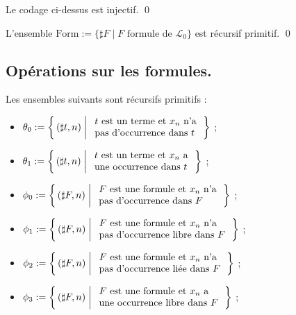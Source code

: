 \documentclass[./main]{subfiles}
\begin{document}
 \begin{lem}
   Le codage ci-dessus est injectif.
   \qed
 \end{lem}

 \begin{lem}
   L'ensemble $\mathrm{Form} := \{\sharp F  \mid F \text{ formule de } \mathcal{L}_0\} $ est récursif primitif.
   \qed
 \end{lem}

 \subsection{Opérations sur les formules.}

 \begin{lem}
   Les ensembles suivants sont récursifs primitifs :
   \footnotesize
   \begin{itemize}
     \item $\theta_0 := \mleft\{\,(\sharp t, n) \;\middle|\; \begin{array}{l} \text{$t$ est un terme et $x_n$ n'a}\\ \text{pas d'occurrence dans $t$} \end{array} \,\mright\}$ ;
     \item $\theta_1 := \mleft\{\,(\sharp t, n) \;\middle|\; \begin{array}{l} \text{$t$ est un terme et $x_n$ a}\\ \text{une occurrence dans $t$} \end{array} \,\mright\}$ ;
     \item $\phi_0 := \mleft\{\,(\sharp F, n) \;\middle|\; \begin{array}{l} \text{$F$ est une formule et $x_n$ n'a}\\ \text{pas d'occurrence dans $F$} \end{array} \,\mright\}$ ;
     \item $\phi_1 := \mleft\{\,(\sharp F, n) \;\middle|\; \begin{array}{l} \text{$F$ est une formule et $x_n$ n'a}\\ \text{pas d'occurrence libre dans $F$} \end{array} \,\mright\}$ ;
     \item $\phi_2 := \mleft\{\,(\sharp F, n) \;\middle|\; \begin{array}{l} \text{$F$ est une formule et $x_n$ n'a}\\ \text{pas d'occurrence liée dans $F$} \end{array} \,\mright\}$ ;
     \item $\phi_3 := \mleft\{\,(\sharp F, n) \;\middle|\; \begin{array}{l} \text{$F$ est une formule et $x_n$ a}\\ \text{une occurrence libre dans $F$} \end{array} \,\mright\}$ ;

\end{itemize}
\end{lem}
\end{document}
